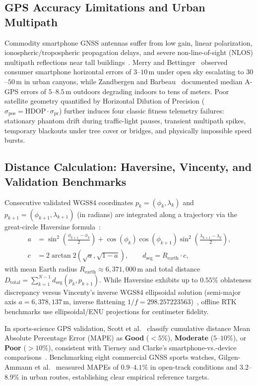 \subsection{GPS Accuracy Limitations and Urban Multipath}
Commodity smartphone GNSS antennas suffer from low gain, linear polarization, ionospheric/tropospheric propagation delays, and severe non-line-of-sight (NLOS) multipath reflections near tall buildings~\cite{merry2019gps,zandbergen2011gps,yun2022gnss}. Merry and Bettinger~\cite{merry2019gps} observed consumer smartphone horizontal errors of $3$--$10$\,m under open sky escalating to $30$--$50$\,m in urban canyons, while Zandbergen and Barbeau~\cite{zandbergen2011gps} documented median A-GPS errors of $5$--$8.5$\,m outdoors degrading indoors to tens of meters. Poor satellite geometry quantified by Horizontal Dilution of Precision ($\sigma_{\text{pos}} = \text{HDOP} \cdot \sigma_{\text{pr}}$) further induces four classic fitness telemetry failures: stationary phantom drift during traffic-light pauses, transient multipath spikes, temporary blackouts under tree cover or bridges, and physically impossible speed bursts.

\subsection{Distance Calculation: Haversine, Vincenty, and Validation Benchmarks}
Consecutive validated WGS84 coordinates $p_k = (\phi_k, \lambda_k)$ and $p_{k+1} = (\phi_{k+1}, \lambda_{k+1})$ (in radians) are integrated along a trajectory via the great-circle Haversine formula~\cite{sinnott1984virtues}:
\begin{align}
    a &= \sin^2\!\left(\frac{\phi_{k+1}-\phi_k}{2}\right) + \cos(\phi_k)\cos(\phi_{k+1})\sin^2\!\left(\frac{\lambda_{k+1}-\lambda_k}{2}\right), \\
    c &= 2 \arctan2\!\left(\sqrt{a}, \sqrt{1-a}\right), \qquad d_{\text{seg}} = R_{\text{earth}} \cdot c,
    \label{eq:haversine}
\end{align}
with mean Earth radius $R_{\text{earth}} \approx 6{,}371{,}000$\,m and total distance $D_{\text{total}} = \sum_{k=1}^{N-1} d_{\text{seg}}(p_k, p_{k+1})$. While Haversine exhibits up to $0.55\%$ oblateness discrepancy versus Vincenty's inverse WGS84 ellipsoidal solution (semi-major axis $a = 6{,}378{,}137$\,m, inverse flattening $1/f = 298.257223563$)~\cite{vincenty1975direct}, offline RTK benchmarks use ellipsoidal/ENU projections for centimeter fidelity.

In sports-science GPS validation, Scott et al.~\cite{scott2016validity} classify cumulative distance Mean Absolute Percentage Error (MAPE) as \textbf{Good} ($<5\%$), \textbf{Moderate} ($5$--$10\%$), or \textbf{Poor} ($>10\%$), consistent with Tierney and Clarke's smartphone-vs.-device comparisons~\cite{tierney2019gps}. Benchmarking eight commercial GNSS sports watches, Gilgen-Ammann et al.~\cite{gilgenammann2020wrist} measured MAPEs of $0.9$--$4.1\%$ in open-track conditions and $3.2$--$8.9\%$ in urban routes, establishing clear empirical reference targets.

